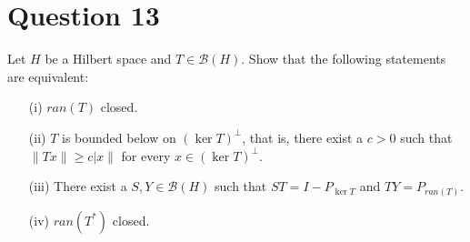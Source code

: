 \section{Question 13}
\horz
  
Let $H$ be a Hilbert space and $T\in \mathcal B(H).$ Show that the following statements are equivalent:
\begin{itemize}
\item[(i)] $ran(T)$ closed.
\item[(ii)] $T$ is bounded below on $(\ker T)^{\perp}$,  that is, there exist a $c>0$ such that $\|Tx\| \geqslant c|x\|$ for every $x\in (\ker T)^{\perp}.$
\item[(iii)] There exist a $S, Y\in \mathcal B(H)$ such that $ST=I- P_{\ker T}$ and $TY = P_{ran(T)}.$
\item[(iv)] $ran(T^*)$ closed.
\end{itemize}

\horz

